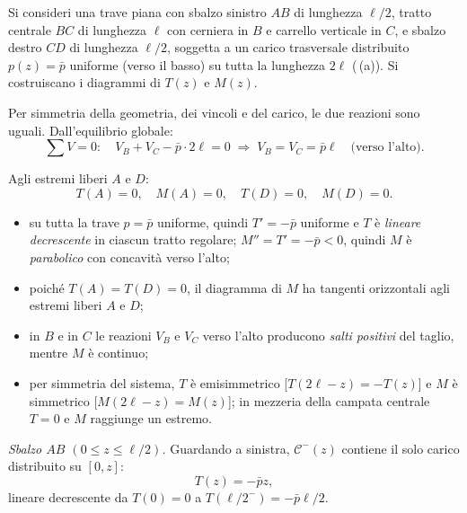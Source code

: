 \begin{esempio}
	Si consideri una trave piana con sbalzo sinistro
	$AB$ di lunghezza $\ell/2$, tratto centrale $BC$
	di lunghezza $\ell$ con cerniera in $B$ e carrello
	verticale in $C$, e sbalzo destro $CD$ di
	lunghezza $\ell/2$, soggetta a un carico
	trasversale distribuito $p(z) = \bar p$ uniforme
	(verso il basso) su tutta la lunghezza $2\ell$
	(\,(a)). Si costruiscano
	i diagrammi di $T(z)$ e $M(z)$.
	
	\begin{svolgimento}
		
		
		
		Per simmetria della geometria, dei vincoli e del
		carico, le due reazioni sono uguali. Dall'equilibrio
		globale:
		\[
		\sum V = 0:\quad
		V_B + V_C - \bar p\cdot 2\ell = 0
		\;\Rightarrow\;
		V_B = V_C = \bar p\ell
		\quad\text{(verso l'alto)}.
		\]
		
		Agli estremi liberi $A$ e $D$:
		\[
		T(A) = 0, \quad M(A) = 0, \quad
		T(D) = 0, \quad M(D) = 0.
		\]
		
		\begin{itemize}[nosep]
			\item su tutta la trave $p = \bar p$ uniforme,
			quindi $T' = -\bar p$ uniforme e $T$ è
			\emph{lineare decrescente} in ciascun tratto
			regolare; $M'' = T' = -\bar p < 0$, quindi $M$
			è \emph{parabolico} con concavità verso l'alto;
			\item poiché $T(A) = T(D) = 0$, il diagramma di
			$M$ ha tangenti orizzontali agli estremi liberi
			$A$ e $D$;
			\item in $B$ e in $C$ le reazioni $V_B$ e $V_C$
			verso l'alto producono \emph{salti positivi} del
			taglio, mentre $M$ è continuo;
			\item per simmetria del sistema, $T$ è
			emisimmetrico [$T(2\ell - z) = -T(z)$] e $M$ è
			simmetrico [$M(2\ell - z) = M(z)$]; in mezzeria
			della campata centrale $T = 0$ e $M$ raggiunge
			un estremo.
		\end{itemize}
		
		
		\textit{Sbalzo $AB$ $(0 \leq z \leq \ell/2)$.}
		Guardando a sinistra, $\mathcal{C}^-(z)$ contiene
		il solo carico distribuito su $[0,z]$:
		\[
		T(z) = -\bar p z,
		\]
		lineare decrescente da $T(0) = 0$ a
		$T(\ell/2^-) = -\bar p\ell/2$.
		

\end{svolgimento}
\end{esempio}
